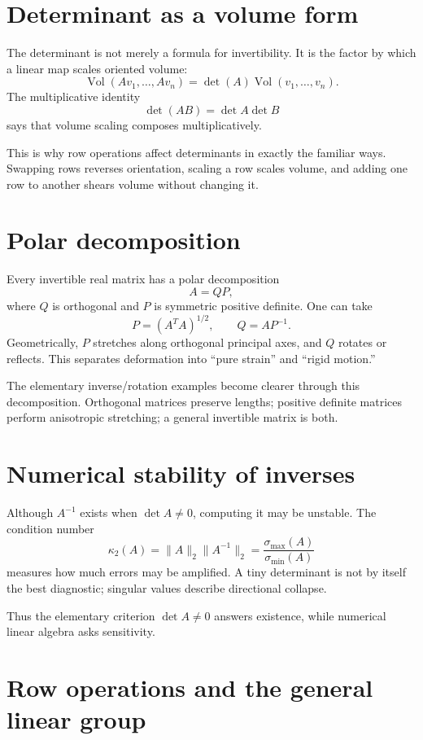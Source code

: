 \section{Determinant as a volume form}

The determinant is not merely a formula for invertibility.  It is the factor by which a linear map scales oriented volume:
\[
  \operatorname{Vol}(Av_1,\ldots,Av_n)=\det(A)\operatorname{Vol}(v_1,\ldots,v_n).
\]
The multiplicative identity
\[
  \det(AB)=\det A\det B
\]
says that volume scaling composes multiplicatively.

This is why row operations affect determinants in exactly the familiar ways.  Swapping rows reverses orientation, scaling a row scales volume, and adding one row to another shears volume without changing it.

\section{Polar decomposition}

Every invertible real matrix has a polar decomposition
\[
  A=QP,
\]
where $Q$ is orthogonal and $P$ is symmetric positive definite.  One can take
\[
  P=(A^TA)^{1/2},\qquad Q=AP^{-1}.
\]
Geometrically, $P$ stretches along orthogonal principal axes, and $Q$ rotates or reflects.  This separates deformation into ``pure strain'' and ``rigid motion.''

The elementary inverse/rotation examples become clearer through this decomposition.  Orthogonal matrices preserve lengths; positive definite matrices perform anisotropic stretching; a general invertible matrix is both.

\section{Numerical stability of inverses}

Although $A^{-1}$ exists when $\det A\ne0$, computing it may be unstable.  The condition number
\[
  \kappa_2(A)=\|A\|_2\|A^{-1}\|_2=\frac{\sigma_{\max}(A)}{\sigma_{\min}(A)}
\]
measures how much errors may be amplified.  A tiny determinant is not by itself the best diagnostic; singular values describe directional collapse.

Thus the elementary criterion $\det A\ne0$ answers existence, while numerical linear algebra asks sensitivity.

\section{Row operations and the general linear group}

